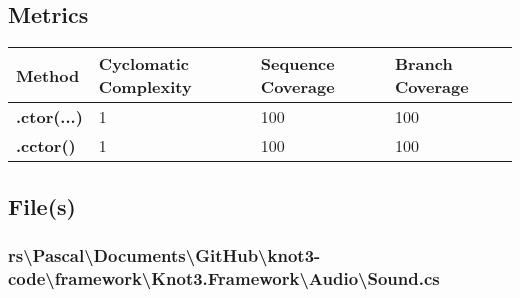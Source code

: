 \documentclass[a4paper,10pt]{article}
\begin{document}
\subsection{Metrics}
\begin{longtable}[l]{|l|l|l|l|}
\hline
\textbf{Method} & \textbf{Cyclomatic Complexity} & \textbf{Sequence Coverage} & \textbf{Branch Coverage}\\
\hline
\textbf{.ctor(...)} & 1 & 100 & 100\\
\hline
\textbf{.cctor()} & 1 & 100 & 100\\
\hline
\end{longtable}
\subsection{File(s)}
\subsubsection{rs\textbackslash Pascal\textbackslash Documents\textbackslash GitHub\textbackslash knot3-code\textbackslash framework\textbackslash Knot3.Framework\textbackslash Audio\textbackslash Sound.cs}
\end{document}

